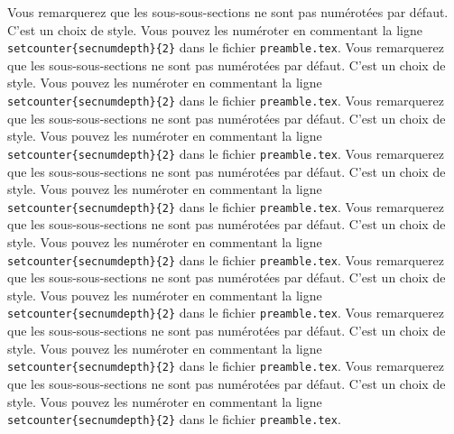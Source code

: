Vous remarquerez que les sous-sous-sections ne sont pas numérotées par défaut. C'est un choix de style. Vous pouvez les numéroter en commentant la ligne \texttt{\\setcounter\{secnumdepth\}\{2\}} dans le fichier \texttt{preamble.tex}.
Vous remarquerez que les sous-sous-sections ne sont pas numérotées par défaut. C'est un choix de style. Vous pouvez les numéroter en commentant la ligne \texttt{\\setcounter\{secnumdepth\}\{2\}} dans le fichier \texttt{preamble.tex}.
Vous remarquerez que les sous-sous-sections ne sont pas numérotées par défaut. C'est un choix de style. Vous pouvez les numéroter en commentant la ligne \texttt{\\setcounter\{secnumdepth\}\{2\}} dans le fichier \texttt{preamble.tex}.
Vous remarquerez que les sous-sous-sections ne sont pas numérotées par défaut. C'est un choix de style. Vous pouvez les numéroter en commentant la ligne \texttt{\\setcounter\{secnumdepth\}\{2\}} dans le fichier \texttt{preamble.tex}.
Vous remarquerez que les sous-sous-sections ne sont pas numérotées par défaut. C'est un choix de style. Vous pouvez les numéroter en commentant la ligne \texttt{\\setcounter\{secnumdepth\}\{2\}} dans le fichier \texttt{preamble.tex}.
Vous remarquerez que les sous-sous-sections ne sont pas numérotées par défaut. C'est un choix de style. Vous pouvez les numéroter en commentant la ligne \texttt{\\setcounter\{secnumdepth\}\{2\}} dans le fichier \texttt{preamble.tex}.
Vous remarquerez que les sous-sous-sections ne sont pas numérotées par défaut. C'est un choix de style. Vous pouvez les numéroter en commentant la ligne \texttt{\\setcounter\{secnumdepth\}\{2\}} dans le fichier \texttt{preamble.tex}.
Vous remarquerez que les sous-sous-sections ne sont pas numérotées par défaut. C'est un choix de style. Vous pouvez les numéroter en commentant la ligne \texttt{\\setcounter\{secnumdepth\}\{2\}} dans le fichier \texttt{preamble.tex}.
